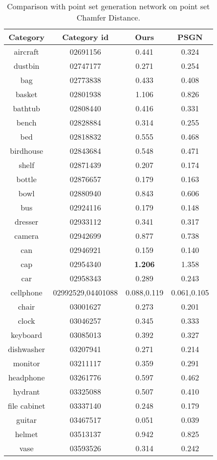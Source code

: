 \begin{table*}
	\centering
	\caption{Comparison with point set generation network on point set Chamfer Distance. }
	\begin{tabular}{c c c c}
		Category & Category id & Ours & PSGN\cite{PSGN} \\
		\hline
		aircraft & 02691156 & 0.441 & 0.324\\   
		dustbin & 02747177 & 0.271 & 0.254\\
		bag & 02773838  & 0.433 &  0.408\\
		basket & 02801938 & 1.106 & 0.826\\
		bathtub & 02808440 & 0.416 & 0.331\\
		bench & 02828884 & 0.314 & 0.255\\
		bed & 02818832 & 0.555 & 0.468\\
		birdhouse & 02843684 & 0.548 & 0.471\\
		shelf & 02871439 & 0.207 & 0.174\\
		bottle & 02876657 & 0.179 & 0.163\\
		bowl & 02880940 & 0.843 & 0.606\\
		bus & 02924116 & 0.179 & 0.148\\
		dresser & 02933112 & 0.341 & 0.317\\
		camera & 02942699 & 0.877 & 0.738\\
		can & 02946921 & 0.159 & 0.140\\
		cap & 02954340 & {\color{green} \textbf{1.206}} & 1.358\\
		car & 02958343 & 0.289 & 0.243\\
		cellphone & 02992529,04401088 & 0.088,0.119 & 0.061,0.105\\
		chair & 03001627 & 0.273 & 0.201\\
		clock & 03046257 & 0.345 & 0.333\\
		keyboard & 03085013 & 0.392 & 0.327\\
		dishwasher & 03207941 & 0.271 & 0.214\\
		monitor & 03211117 & 0.359 & 0.291\\
		headphone & 03261776 & 0.597 & 0.462\\
		hydrant & 03325088 & 0.507 & 0.410\\
		file cabinet& 03337140 & 0.248 & 0.179\\
		guitar & 03467517 & 0.051 & 0.039\\
		helmet & 03513137 & 0.942 & 0.825\\
		vase & 03593526 & 0.314 & 0.242\\

\end{tabular}
\end{table*}
